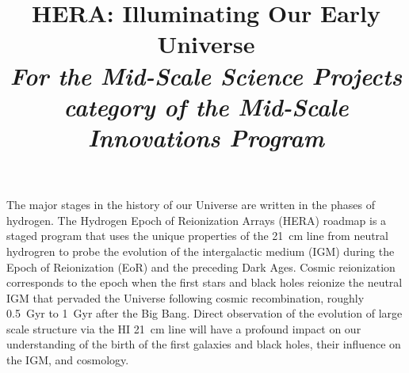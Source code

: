 \documentclass[preprint]{aastex}
\def\HI{{H{\small I }}}
\begin{document}
\title{HERA: Illuminating Our Early Universe\\
{\it For the Mid-Scale Science Projects category of the Mid-Scale Innovations Program}} 



{ \setlength{\parindent}{0cm}
The major stages in the history of our Universe are written in the phases of hydrogen. The Hydrogen Epoch of Reionization Arrays (HERA) roadmap is a staged program that uses the unique properties of the 21~cm line from neutral hydrogren to probe the evolution of the intergalactic medium (IGM) during the Epoch of Reionization (EoR) and the preceding Dark Ages. Cosmic reionization corresponds to the epoch when the first stars and black holes reionize the neutral IGM that pervaded the Universe following cosmic recombination, roughly 0.5~Gyr to 1~Gyr after the Big Bang. Direct observation of the evolution of large scale structure via the \HI 21~cm line will have a profound impact on our understanding of the birth of the first galaxies and black holes, their influence on the IGM, and cosmology.}  
\end{document}
